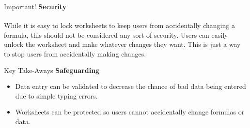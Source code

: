 \begin{center}
	\begin{infobox}{Important!}
		\textbf{Security}
		\\
		\\
		While it is easy to lock worksheets to keep users from accidentally changing a formula, this should not be considered any sort of security. Users can easily unlock the worksheet and make whatever changes they want. This is just a way to stop users from accidentally making changes.
	\end{infobox}
\end{center}

\begin{center}
	\begin{tkwbox}{Key Take-Aways}
		\textbf{Safeguarding}
		\\
		\begin{itemize}
			\setlength{\itemsep}{0pt}
			\setlength{\parskip}{0pt}
			\setlength{\parsep}{0pt}
			
			\item Data entry can be validated to decrease the chance of bad data being entered due to simple typing errors.
			\item Worksheets can be protected so users cannot accidentally change formulas or data.
			
		\end{itemize}
	\end{tkwbox}
\end{center}

